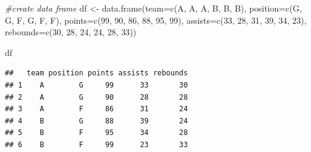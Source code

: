 \documentclass[
]{book}
\newenvironment{Shaded}{\begin{snugshade}}{\end{snugshade}}
\newcommand{\AttributeTok}[1]{\textcolor[rgb]{0.77,0.63,0.00}{#1}}
\newcommand{\CommentTok}[1]{\textcolor[rgb]{0.56,0.35,0.01}{\textit{#1}}}
\newcommand{\DecValTok}[1]{\textcolor[rgb]{0.00,0.00,0.81}{#1}}
\newcommand{\FunctionTok}[1]{\textcolor[rgb]{0.00,0.00,0.00}{#1}}
\newcommand{\NormalTok}[1]{#1}
\newcommand{\OtherTok}[1]{\textcolor[rgb]{0.56,0.35,0.01}{#1}}
\newcommand{\SpecialCharTok}[1]{\textcolor[rgb]{0.00,0.00,0.00}{#1}}
\newcommand{\StringTok}[1]{\textcolor[rgb]{0.31,0.60,0.02}{#1}}
\begin{document}
\begin{Shaded}
\begin{Highlighting}[]
\CommentTok{\#create data frame}
\NormalTok{df }\OtherTok{\textless{}{-}} \FunctionTok{data.frame}\NormalTok{(}\AttributeTok{team=}\FunctionTok{c}\NormalTok{(}\StringTok{\textquotesingle{}A\textquotesingle{}}\NormalTok{, }\StringTok{\textquotesingle{}A\textquotesingle{}}\NormalTok{, }\StringTok{\textquotesingle{}A\textquotesingle{}}\NormalTok{, }\StringTok{\textquotesingle{}B\textquotesingle{}}\NormalTok{, }\StringTok{\textquotesingle{}B\textquotesingle{}}\NormalTok{, }\StringTok{\textquotesingle{}B\textquotesingle{}}\NormalTok{),}
                 \AttributeTok{position=}\FunctionTok{c}\NormalTok{(}\StringTok{\textquotesingle{}G\textquotesingle{}}\NormalTok{, }\StringTok{\textquotesingle{}G\textquotesingle{}}\NormalTok{, }\StringTok{\textquotesingle{}F\textquotesingle{}}\NormalTok{, }\StringTok{\textquotesingle{}G\textquotesingle{}}\NormalTok{, }\StringTok{\textquotesingle{}F\textquotesingle{}}\NormalTok{, }\StringTok{\textquotesingle{}F\textquotesingle{}}\NormalTok{),}
                 \AttributeTok{points=}\FunctionTok{c}\NormalTok{(}\DecValTok{99}\NormalTok{, }\DecValTok{90}\NormalTok{, }\DecValTok{86}\NormalTok{, }\DecValTok{88}\NormalTok{, }\DecValTok{95}\NormalTok{, }\DecValTok{99}\NormalTok{),}
                 \AttributeTok{assists=}\FunctionTok{c}\NormalTok{(}\DecValTok{33}\NormalTok{, }\DecValTok{28}\NormalTok{, }\DecValTok{31}\NormalTok{, }\DecValTok{39}\NormalTok{, }\DecValTok{34}\NormalTok{, }\DecValTok{23}\NormalTok{),}
                 \AttributeTok{rebounds=}\FunctionTok{c}\NormalTok{(}\DecValTok{30}\NormalTok{, }\DecValTok{28}\NormalTok{, }\DecValTok{24}\NormalTok{, }\DecValTok{24}\NormalTok{, }\DecValTok{28}\NormalTok{, }\DecValTok{33}\NormalTok{))}

\NormalTok{df}
\end{Highlighting}
\end{Shaded}

\begin{verbatim}
##   team position points assists rebounds
## 1    A        G     99      33       30
## 2    A        G     90      28       28
## 3    A        F     86      31       24
## 4    B        G     88      39       24
## 5    B        F     95      34       28
## 6    B        F     99      23       33
\end{verbatim}

\begin{Shaded}
\end{Shaded}
\end{document}
